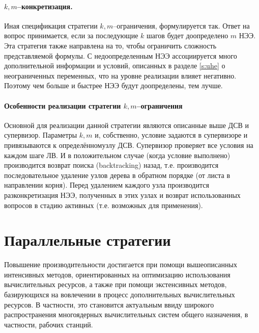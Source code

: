 \paragraph{$k,m$--конкретизация.} Иная спецификация стратегии $k,m$--ограничения, формулируется так. Ответ на вопрос принимается, если за последующие $k$ шагов будет доопределено $m$ НЭЭ. Эта стратегия также направлена на то, чтобы ограничить сложность представляемой формулы. С недоопределенным НЭЭ ассоциируется много дополнительной информации и условий, описанных в разделе \ref{s:uhe} о неограниченных переменных, что на уровне реализации влияет негативно. Поэтому чем больше и быстрее НЭЭ будут доопределены, тем лучше.

\paragraph{Особенности реализации стратегии $k,m$--ограничения}
Основной для реализации данной стратегии являются описанные выше ДСВ и супервизор. Параметры $k,m$ и, собственно, условие задаются в супервизоре и привязываются к определённомузлу ДСВ. Супервизор проверяет все условия на каждом шаге ЛВ. И в положительном случае (когда условие выполнено) производится возврат поиска (backtracking) назад, т.е. производится последовательное удаление узлов дерева в обратном порядке (от листа в направлении корня). Перед удалением каждого узла производится разконкретизация НЭЭ, полученных в этих узлах и возврат использованных вопросов в стадию активных (т.е. возможных для применения).



\section{Параллельные стратегии}

Повышение производительности достигается при помощи вышеописанных интенсивных методов, ориентированных на оптимизацию использования вычислительных ресурсов, а также при помощи экстенсивных методов, базирующихся на вовлечении в процесс дополнительных вычислительных ресурсов. В частности, это становится актуальным ввиду широкого распространения многоядерных вычислительных систем общего назначения, в частности, рабочих станций.

